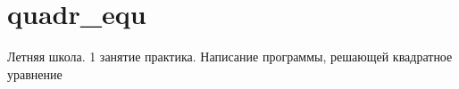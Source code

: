 \chapter{quadr\+\_\+equ}
\hypertarget{md_README}{}\label{md_README}
\label{md_README_autotoc_md0}%
%
Летняя школа. 1 занятие практика. Написание программы, решающей квадратное уравнение 